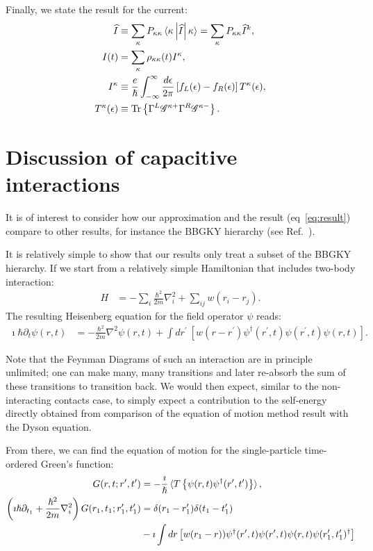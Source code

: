 Finally, we state the result for the current:
\begin{align*}
\widehat{I} &\equiv \sum_\kappa P_{\kappa\kappa} \braket{ \kappa \left|\widehat{I}\right|\kappa}=\sum_\kappa P_{\kappa\kappa} \widehat{I}^k,\\ 
I(t) &= \sum_\kappa \rho_{\kappa\kappa}(t) I^\kappa, \\
I^\kappa&\equiv \frac{e}{\hslash} \int^\infty_{-\infty} \frac{d\epsilon}{2\pi} \left[ f_L(\epsilon) - f_R (\epsilon) \right] T^\kappa (\epsilon),\\
T^\kappa(\epsilon) &\equiv \text{Tr}\left\{ \Gamma^L \mathscr{G}^{\kappa+} \Gamma^R \mathscr{G}^{\kappa-} \right\}.
\end{align*}



\section{Discussion of capacitive interactions}
\label{sec:discussioncapacitive}
It is of interest to consider how our approximation and the result (eq~\ref{eq:result}) compare to other results, for instance the BBGKY hierarchy (see Ref.~\cite{diventra}).

It is relatively simple to show that our results only treat a subset of the BBGKY hierarchy. If we start from a relatively simple Hamiltonian that includes two-body interaction:
\begin{align*}
H &= -\sum_i \frac{\hbar^2}{2m} \nabla_i^2 + \sum_{ij} w(r_i - r_j).
\end{align*}
The resulting Heisenberg equation for the field operator $\psi$ reads:
\begin{align*}
\imath\hbar\partial_t \psi(r, t) &= -\frac{\hbar^2}{2m} \nabla^2 \psi(r,t) + \int dr^\prime \: \left[ w(r-r^\prime) \psi^\dagger (r^\prime, t) \psi(r^\prime,t) \psi(r,t)\right].
\end{align*}

Note that the Feynman Diagrams of such an interaction are in principle unlimited; one can make many, many transitions and later re-absorb the sum of these transitions to transition back. We would then expect, similar to the non\hyp{}interacting contacts case, to simply expect a contribution to the self-energy directly obtained from comparison of the equation of motion method result with the Dyson equation.

From there, we can find the equation of motion for the single-particle time-ordered Green's function:
\begin{align*}
G(r,t;r^\prime,t^\prime) &= -\frac{\imath}{\hslash}\braket{T \left\{ \psi(r,t) \psi^\dagger(r^\prime,t^\prime)\right\}}, \\
\left(\imath\hslash\partial_{t_1} + \frac{\hslash^2}{2m}\nabla_i^2\right) G(r_1, t_1; r_1^\prime, t_1^\prime) &= \delta(r_1 - r_1^\prime) \delta(t_1 - t_1^\prime) \\&- \imath \int dr\left[w(r_1 - r) ) \psi^\dagger (r^\prime, t) \psi(r^\prime,t) \psi(r,t) \psi(r_1^\prime, t_1^\prime)^\dagger\right]
\end{align*}

